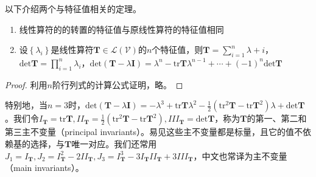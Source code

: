 \documentclass[main.tex]{subfiles}
\begin{document}
以下介绍两个与特征值相关的定理\cite[“性质1、性质2、p.~118]{周胜林2012线性代数}。

\begin{theorem}
\begin{enumerate}
    \item 线性算符的的转置的特征值与原线性算符的特征值相同
    \item 设$\left\{\lambda_i\right\}$是线性算符$\mathbf{T}\in\mathcal{L}\left(\mathcal{V}\right)$的$n$个特征值，则$\mathbf{T}=\sum_{i=1}^n\lambda+i$，$\mathrm{det}\mathbf{T}=\prod_{i=1}^n\lambda_i$，$\mathrm{det}\left(\mathbf{T}-\lambda\mathbf{I}\right)=\lambda^n-\mathrm{tr}\mathbf{T}\lambda^{n-1}+\cdots+\left(-1\right)^n\mathrm{det}\mathbf{T}$
\end{enumerate}
\end{theorem}
\begin{proof}
利用$n$阶行列式的计算公式证明，略。
\end{proof}

特别地，当$n=3$时，$\mathrm{det}\left(\mathbf{T}-\lambda\mathbf{I}\right)=-\lambda^3+\mathrm{tr}\mathbf{T}\lambda^2-\frac{1}{2}\left(\mathrm{tr}^2\mathbf{T}-\mathrm{tr}\mathbf{T}^2\right)\lambda+\mathrm{det}\mathbf{T}$。我们令$I_\mathbf{T}=\mathrm{tr}\mathbf{T},II_\mathbf{T}=\frac{1}{2}\left(\mathrm{tr}^2\mathbf{T}-\mathrm{tr}\mathbf{T}^2\right),III_\mathbf{T}=\mathrm{det}\mathbf{T}$，称为$\mathbf{T}$的第一、第二和第三主不变量（principal invariants）。易见这些主不变量都是标量，且它的值不依赖基的选择，与$\mathbf{T}$唯一对应。我们还常用$J_1=I_\mathbf{T},J_2=I_\mathbf{T}^2-2II_\mathbf{T},J_3=I_\mathbf{T}^3-3I_\mathbf{T}II_\mathbf{T}+3III_\mathbf{T}$，中文也常译为主不变量（main invariants）。
\end{document}
